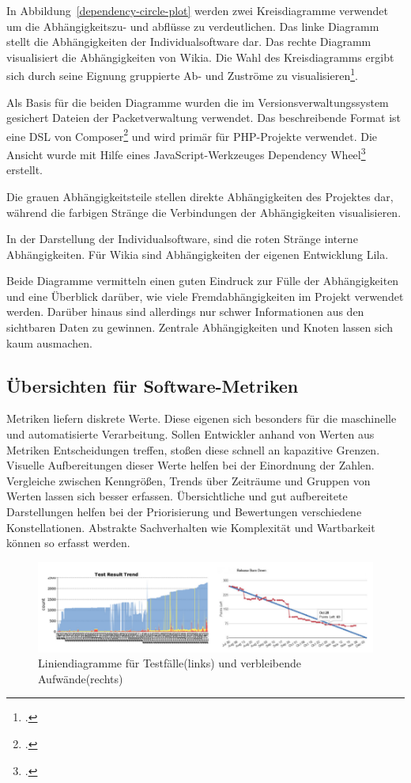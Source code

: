 In Abbildung~\ref{dependency-circle-plot} werden zwei Kreisdiagramme verwendet um die Abhängigkeitszu\hyp{} und abflüsse zu verdeutlichen. Das linke Diagramm stellt die Abhängigkeiten der Individualsoftware dar. Das rechte Diagramm visualisiert die Abhängigkeiten von Wikia. Die Wahl des Kreisdiagramms ergibt sich durch seine Eignung gruppierte Ab- und Zuströme zu visualisieren\footcite{visualizing-graph-data}. 

Als Basis für die beiden Diagramme wurden die im Versionsverwaltungssystem gesichert Dateien der Packetverwaltung verwendet. Das beschreibende Format ist eine DSL von Composer\footcite{composer-json} und wird primär für PHP-Projekte verwendet. Die Ansicht wurde mit Hilfe eines JavaScript-Werkzeuges \glqq Dependency Wheel\grqq{}\footcite{composer-dependency-wheel} erstellt.

Die grauen Abhängigkeitsteile stellen direkte Abhängigkeiten des Projektes dar, während die farbigen Stränge die Verbindungen der Abhängigkeiten visualisieren.

In der Darstellung der Individualsoftware, sind die roten Stränge interne Abhängigkeiten. Für Wikia sind Abhängigkeiten der eigenen Entwicklung Lila.

Beide Diagramme vermitteln einen guten Eindruck zur Fülle der Abhängigkeiten und eine Überblick darüber, wie viele Fremdabhängigkeiten im Projekt verwendet werden. Darüber hinaus sind allerdings nur schwer Informationen aus den sichtbaren Daten zu gewinnen. Zentrale Abhängigkeiten und Knoten lassen sich kaum ausmachen.

\subsection{Übersichten für Software-Metriken}

Metriken liefern diskrete Werte. Diese eigenen sich besonders für die maschinelle und automatisierte Verarbeitung. Sollen Entwickler anhand von Werten aus Metriken Entscheidungen treffen, stoßen diese schnell an kapazitive Grenzen. Visuelle Aufbereitungen dieser Werte helfen bei der Einordnung der Zahlen. Vergleiche zwischen Kenngrößen, Trends über Zeiträume und Gruppen von Werten lassen sich besser erfassen. Übersichtliche und gut aufbereitete Darstellungen helfen bei der Priorisierung und Bewertungen verschiedene Konstellationen. Abstrakte Sachverhalten wie Komplexität und Wartbarkeit können so erfasst werden.

\begin{figure}[htbp]
  \includegraphics[width=\textwidth, height=\textheight, keepaspectratio]
    {resources/line-chart.pdf}
  \caption{Liniendiagramme für Testfälle(links) und verbleibende Aufwände(rechts)}
  \label{line-chart}
\end{figure}
